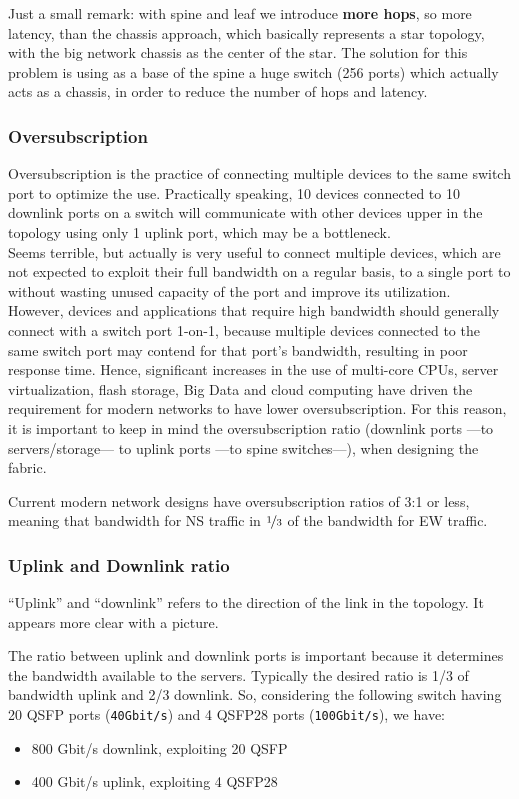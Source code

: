 Just a small remark: with spine and leaf we introduce \textbf{more hops}, so more latency, than the chassis approach, which basically represents a star topology, with the big network chassis as the center of the star. 
The solution for this problem is using as a base of the spine a huge switch (256 ports) which actually acts as a chassis, in order to reduce the number of hops and latency.

\subsubsection{Oversubscription}
Oversubscription is the practice of connecting multiple devices to the same
switch port to optimize the use.
Practically speaking, 10 devices connected to 10 downlink ports on a switch will communicate with other devices upper in the topology using only 1 uplink port, which may be a bottleneck.\\
Seems terrible, but actually is very useful to connect multiple devices, which are not expected to exploit their full bandwidth on a regular basis, to a single port to without wasting unused
capacity of the port and improve its utilization.\\
However, devices and applications that require high bandwidth should generally connect with a switch
port 1-on-1, because multiple devices connected to the same switch port may
contend for that port’s bandwidth, resulting in poor response time. 
Hence,
significant increases in the use of multi-core CPUs, server virtualization, flash
storage, Big Data and cloud computing have driven the requirement for modern networks to have lower oversubscription. For this reason, it is important
to keep in mind the oversubscription ratio (downlink ports ---to servers/storage--- to uplink ports ---to spine switches---), when designing the fabric.

Current modern network designs have oversubscription ratios of 3:1 or less, meaning that bandwidth for NS traffic in $\nicefrac{1}{3}$ of the bandwidth for EW traffic.

\newpage
\subsubsection{Uplink and Downlink ratio}
``Uplink'' and ``downlink'' refers to the direction of the link in the topology. It appears more clear with a picture.

The ratio between uplink and downlink ports is important because it determines the bandwidth available to the servers. Typically the desired ratio is 1/3 of bandwidth uplink and 2/3 downlink.
So, considering the following switch having 20 QSFP ports (\texttt{40Gbit/s}) and 4 QSFP28 ports (\texttt{100Gbit/s}), we have:
\begin{itemize}
   \item 800 Gbit/s downlink, exploiting 20 QSFP
   \item 400 Gbit/s uplink, exploiting 4 QSFP28
\end{itemize}

